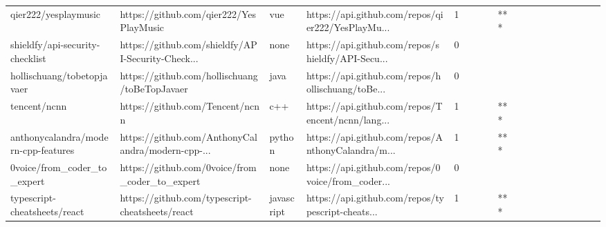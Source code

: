 \begin{tabular}{llllrlllllllllllll}
qier222/yesplaymusic                               &            https://github.com/qier222/YesPlayMusic &               vue &  https://api.github.com/repos/qier222/YesPlayMu... &       1 &         &        &           &            *** &                 &        &           &           &          &          &       &              &          \\
shieldfy/api-security-checklist                    &  https://github.com/shieldfy/API-Security-Check... &              none &  https://api.github.com/repos/shieldfy/API-Secu... &       0 &         &        &           &                &                 &        &           &           &          &          &       &              &          \\
hollischuang/tobetopjavaer                         &      https://github.com/hollischuang/toBeTopJavaer &              java &  https://api.github.com/repos/hollischuang/toBe... &       0 &         &        &           &                &                 &        &           &           &          &          &       &              &          \\
tencent/ncnn                                       &                    https://github.com/Tencent/ncnn &               c++ &  https://api.github.com/repos/Tencent/ncnn/lang... &       1 &         &        &           &            *** &                 &        &           &           &          &          &       &              &          \\
anthonycalandra/modern-cpp-features                &  https://github.com/AnthonyCalandra/modern-cpp-... &            python &  https://api.github.com/repos/AnthonyCalandra/m... &       1 &         &        &           &            *** &                 &        &           &           &          &          &       &              &          \\
0voice/from\_coder\_to\_expert                        &     https://github.com/0voice/from\_coder\_to\_expert &              none &  https://api.github.com/repos/0voice/from\_coder... &       0 &         &        &           &                &                 &        &           &           &          &          &       &              &          \\
typescript-cheatsheets/react                       &    https://github.com/typescript-cheatsheets/react &        javascript &  https://api.github.com/repos/typescript-cheats... &       1 &         &        &           &            *** &                 &        &           &           &          &          &       &              &          \\

\end{tabular}
